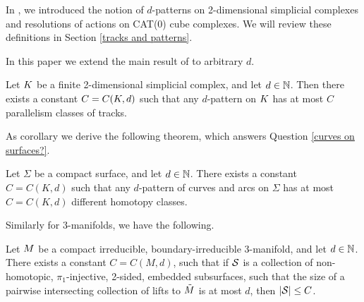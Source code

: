 In \cite{BeLa16}, we introduced the notion of $d$-patterns on 2-dimensional simplicial complexes and resolutions of actions on CAT(0) cube complexes. We will review these definitions in Section \ref{tracks and patterns}.

%

In this paper we extend the main result of \cite{BeLa16} to arbitrary $d$.

\begin{theorem}\label{main result}
	Let $K$ be a finite 2-dimensional simplicial complex, and let $d\in\mathbb N$. Then there exists a constant $C=C(K,d)$ such that any $d$-pattern on $K$ has at most $C$ parallelism classes of tracks.
\end{theorem}

As corollary we derive the following theorem, which answers Question \ref{curves on surfaces?}.

\begin{theorem}\label{thm: bound on subsurfaces}
	Let $\Sigma$ be a compact surface, and let $d\in\mathbb N$. There exists a constant $C=C(K,d)$ such that any $d$-pattern of curves and arcs on $\Sigma$ has at most $C=C(K,d)$ different homotopy classes.
\end{theorem}

Similarly for $3$-manifolds, we have the following.

\begin{theorem}\label{thm: bound on curves}
	Let $M$ be a compact irreducible, boundary-irreducible 3-manifold, and let $d\in\mathbb N$. There exists a constant $C=C(M,d)$, such that if ${\mathcal{S}}$ is a collection of non-homotopic, $\pi_1$-injective, 2-sided, embedded subsurfaces, such that the size of a pairwise intersecting collection of lifts to $\tilde{M}$ is at most $d$, then $|{\mathcal{S}}|\le C$.
\end{theorem}

